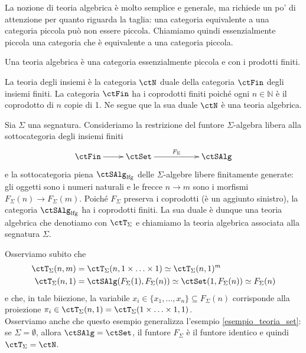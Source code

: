 La nozione di teoria algebrica è molto semplice e generale, ma richiede un po' di attenzione per quanto riguarda la taglia: una
categoria equivalente a una categoria piccola può non essere piccola. Chiamiamo quindi essenzialmente piccola una categoria
che è equivalente a una categoria piccola.

\begin{definition}\label{def_teoria_alg}
	Una teoria algebrica è una categoria essenzialmente piccola e con i prodotti finiti.
\end{definition}

\begin{example}\label{esempio_teoria_set}
	La teoria degli insiemi è la categoria \(\ctN\) duale della categoria \(\ctFin\) degli insiemi finiti. La categoria \(\ctFin\) ha i coprodotti
	finiti poiché ogni \(n \in \mathbb N\) è il coprodotto di \(n\) copie di 1. Ne segue que la sua duale \(\ctN\) è una teoria algebrica.
\end{example}

\begin{example}\label{esempio_teoria_sigma}
	Sia \(\Sigma\) una segnatura. Consideriamo la restrizione del funtore \(\Sigma\)-algebra libera alla sottocategoria degli insiemi finiti
	\[
		\xymatrix{\ctFin \ar[r] & \ctSet \ar[rr]^-{F_{\Sigma}} & & \ctSAlg}
	\]
	e la sottocategoria piena \(\ctSAlg_{\mathrm{lfg}}\) delle \(\Sigma\)-algebre libere finitamente generate: gli oggetti sono i numeri naturali e le frecce
	\(n \to m\) sono i morfismi \(F_{\Sigma}(n) \to F_{\Sigma}(m)\). Poiché \(F_{\Sigma}\) preserva i coprodotti (è un aggiunto sinistro), la
	categoria \(\ctSAlg_{\mathrm{lfg}}\) ha i coprodotti finiti. La sua duale è dunque una teoria algebrica che denotiamo con \(\ctT_{\Sigma}\) e
	chiamiamo la teoria algebrica associata alla segnatura \(\Sigma\).

	Osserviamo subito che
	\begin{align*}
		\ctT_{\Sigma}(n,m) & = \ctT_{\Sigma}(n,1 \times \ldots \times 1) \simeq \ctT_{\Sigma}(n,1)^m                    \\
		\ctT_{\Sigma}(n,1) & = \ctSAlg(F_{\Sigma}(1),F_{\Sigma}(n)) \simeq \ctSet(1,F_{\Sigma}(n)) \simeq F_{\Sigma}(n)
	\end{align*}
	e che, in tale biiezione, la variabile \(x_i \in \{x_1,\ldots,x_n\} \subseteq F_{\Sigma}(n)\) corrisponde alla proiezione
	\(\pi_i \in \ctT_{\Sigma}(n,1) = \ctT_{\Sigma}(1 \times \ldots \times 1,1)\). \\
	Osserviamo anche che questo esempio generalizza l'esempio \ref{esempio_teoria_set}: se \(\Sigma = \emptyset\), allora \(\ctSAlg = \ctSet\),
	il funtore \(F_{\Sigma}\) è il funtore identico e quindi \(\ctT_{\Sigma} = \ctN\).
\end{example}

